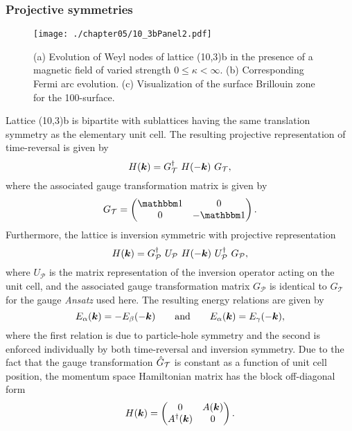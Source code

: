 \subsubsection{Projective symmetries}
%
%
%
\begin{figure}[tb]
	\centering
	\texttt{[image: ./chapter05/10\_3bPanel2.pdf]}
	\caption{
		(a) Evolution of Weyl nodes of lattice (10,3)b in the presence of a magnetic field of varied strength $0 \leq \kappa < \infty$.
		(b) Corresponding Fermi arc evolution.
		(c) Visualization of the surface Brillouin zone for the 100-surface.
	}
	\label{fig:chapter05_10_3bPanel2}
\end{figure}
%
Lattice (10,3)b is bipartite with sublattices having the same translation symmetry as the elementary unit cell.
The resulting projective representation of time-reversal is given by
%
\begin{equation}
	H(\bm{k}) = G^{\dagger}_{\mathcal{T}}~H(-\bm{k})~G_{\mathcal{T}},
\end{equation}
%
where the associated gauge transformation matrix is given by
%
\begin{equation}
	G_{\mathcal{T}} =
		\begin{pmatrix}
			\id & 0 \\
			0	& -\id
		\end{pmatrix}.
\end{equation}
%
Furthermore, the lattice is inversion symmetric with projective representation
%
\begin{equation}
	H(\bm{k}) = G^{\dagger}_{\mathcal{P}}~U_{\mathcal{P}}~H(-\bm{k})~U^{\dagger}_{\mathcal{P}}~G_{\mathcal{P}},
\end{equation}
%
where $U_{\mathcal{P}}$ is the matrix representation of the inversion operator acting on the unit cell, and the associated gauge transformation matrix $G_{\mathcal{P}}$ is identical to $G_{\mathcal{T}}$ for the gauge \textit{Ansatz} used here.
The resulting energy relations are given by
%
\begin{equation}
	E_{\alpha}(\bm{k}) = -E_{\beta}(-\bm{k}) \qquad {\rm and } \qquad E_{\alpha}(\bm{k}) = E_{\gamma}(-\bm{k}),
\end{equation}
%
where the first relation is due to particle-hole symmetry and the second is enforced individually by both time-reversal and inversion symmetry.
Due to the fact that the gauge transformation $\hat{G}_{\mathcal{T}}$ is constant as a function of unit cell position, the momentum space Hamiltonian matrix has the block off-diagonal form
%
\begin{equation}
	H(\bm{k}) =
		\begin{pmatrix}
			0			& A(\bm{k}) \\
			A^{\dagger}(\bm{k})	& 0
		\end{pmatrix}.
\end{equation}
%


